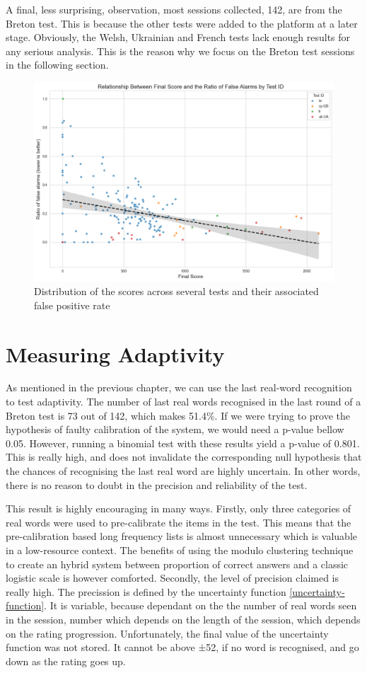 A final, less surprising, observation, most sessions collected, 142, are from the Breton test. This is because the other tests were added to the platform at a later stage. Obviously, the Welsh, Ukrainian and French tests lack enough results for any serious analysis. This is the reason why we focus on the Breton test sessions in the following section.
\begin{figure}
    \centering
    \includegraphics[width=0.8\linewidth]{figures/scores-fa.png}
    \caption{Distribution of the scores across several tests and their associated false positive rate}
    \medskip
    \small
\end{figure}\label{fig:score-fa}

\section{Measuring Adaptivity}
As mentioned in the previous chapter, we can use the last real-word recognition to test adaptivity. The number of last real words recognised in the last round of a Breton test is 73 out of 142, which makes 51.4\%. If we were trying to prove the hypothesis of faulty calibration of the system, we would need a p-value bellow 0.05. However, running a binomial test with these results yield a p-value of 0.801. This is really high, and does not invalidate the corresponding null hypothesis that the chances of recognising the last real word are highly uncertain. In other words, there is no reason to doubt in the precision and reliability of the test.

This result is highly encouraging in many ways. Firstly, only three categories of real words were used to pre-calibrate the items in the test. This means that the pre-calibration based long frequency lists is almost unnecessary which is valuable in a low-resource context. The benefits of using the modulo clustering technique to create an hybrid system between proportion of correct answers and a classic logistic scale is however comforted. Secondly, the level of precision claimed is really high. The precission is defined by the uncertainty function \ref{uncertainty-function}. It is variable, because dependant on the the number of real words seen in the session, number which depends on the length of the session, which depends on the rating progression. Unfortunately, the final value of the uncertainty function was not stored. It cannot be above ±52, if no word is recognised, and go down as the rating goes up.

